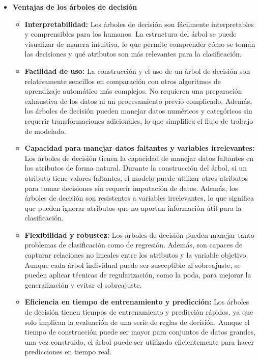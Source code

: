 \begin{itemize}
    \item \textbf{Ventajas de los árboles de decisión}
    \begin{itemize}
        \item \textbf{Interpretabilidad:} Los árboles de decisión son fácilmente interpretables y comprensibles para los humanos. La estructura del árbol se puede visualizar de manera intuitiva, lo que permite comprender cómo se toman las decisiones y qué atributos son más relevantes para la clasificación.
        \item \textbf{Facilidad de uso:} La construcción y el uso de un árbol de decisión son relativamente sencillos en comparación con otros algoritmos de aprendizaje automático más complejos. No requieren una preparación exhaustiva de los datos ni un procesamiento previo complicado. Además, los árboles de decisión pueden manejar datos numéricos y categóricos sin requerir transformaciones adicionales, lo que simplifica el flujo de trabajo de modelado.
        \item \textbf{Capacidad para manejar datos faltantes y variables irrelevantes:} Los árboles de decisión tienen la capacidad de manejar datos faltantes en los atributos de forma natural. Durante la construcción del árbol, si un atributo tiene valores faltantes, el modelo puede utilizar otros atributos para tomar decisiones sin requerir imputación de datos. Además, los árboles de decisión son resistentes a variables irrelevantes, lo que significa que pueden ignorar atributos que no aportan información útil para la clasificación.
        \item \textbf{Flexibilidad y robustez:} Los árboles de decisión pueden manejar tanto problemas de clasificación como de regresión. Además, son capaces de capturar relaciones no lineales entre los atributos y la variable objetivo. Aunque cada árbol individual puede ser susceptible al sobreajuste, se pueden aplicar técnicas de regularización, como la poda, para mejorar la generalización y evitar el sobreajuste.
        \item \textbf{Eficiencia en tiempo de entrenamiento y predicción:} Los árboles de decisión tienen tiempos de entrenamiento y predicción rápidos, ya que solo implican la evaluación de una serie de reglas de decisión. Aunque el tiempo de construcción puede ser mayor para conjuntos de datos grandes, una vez construido, el árbol puede ser utilizado eficientemente para hacer predicciones en tiempo real.
    \end{itemize}

\end{itemize}
